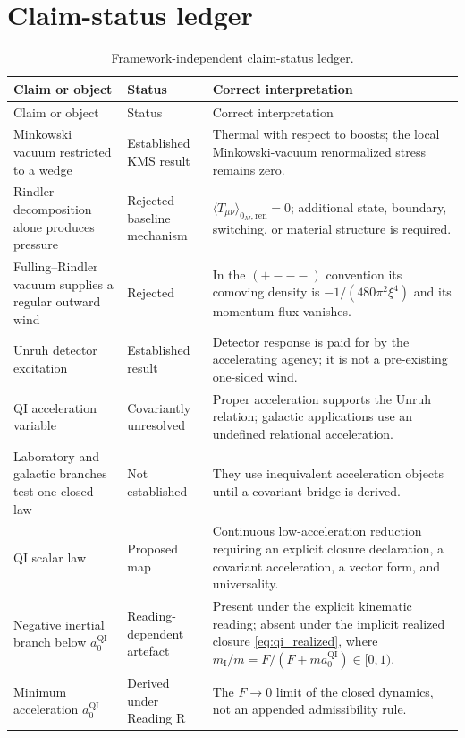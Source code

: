 \documentclass[11pt]{article}
\newcommand{\QI}{\mathrm{QI}}
\begin{document}
\section{Claim-status ledger}
\label{sec:ledger}

\begin{longtable}{>{\raggedright\arraybackslash}p{}>{\raggedright\arraybackslash}p{}>{\raggedright\arraybackslash}p{}}
\caption{Framework-independent claim-status ledger.}\label{tab:claim_ledger}\\
\toprule
Claim or object & Status & Correct interpretation \\
\midrule
\endfirsthead
\toprule
Claim or object & Status & Correct interpretation \\
\midrule
\endhead
Minkowski vacuum restricted to a wedge & Established KMS result & Thermal with respect to boosts; the local Minkowski-vacuum renormalized stress remains zero. \\
Rindler decomposition alone produces pressure & Rejected baseline mechanism & \(\langle T_{\mu\nu}\rangle_{0_M,\mathrm{ren}}=0\); additional state, boundary, switching, or material structure is required. \\
Fulling--Rindler vacuum supplies a regular outward wind & Rejected & In the \((+---)\) convention its comoving density is \(-1/(480\pi^2\xi^4)\) and its momentum flux vanishes. \\
Unruh detector excitation & Established result & Detector response is paid for by the accelerating agency; it is not a pre-existing one-sided wind. \\
QI acceleration variable & Covariantly unresolved & Proper acceleration supports the Unruh relation; galactic applications use an undefined relational acceleration. \\
Laboratory and galactic branches test one closed law & Not established & They use inequivalent acceleration objects until a covariant bridge is derived. \\
QI scalar law & Proposed map & Continuous low-acceleration reduction requiring an explicit closure declaration, a covariant acceleration, a vector form, and universality. \\
Negative inertial branch below \(a_{0}^{\QI}\) & Reading-dependent artefact & Present under the explicit kinematic reading; absent under the implicit realized closure \cref{eq:qi_realized}, where \(m_{\mathrm I}/m=F/(F+ma_{0}^{\QI})\in[0,1)\). \\
Minimum acceleration \(a_{0}^{\QI}\) & Derived under Reading R & The \(F\to0\) limit of the closed dynamics, not an appended admissibility rule. \\

\end{longtable}
\end{document}
